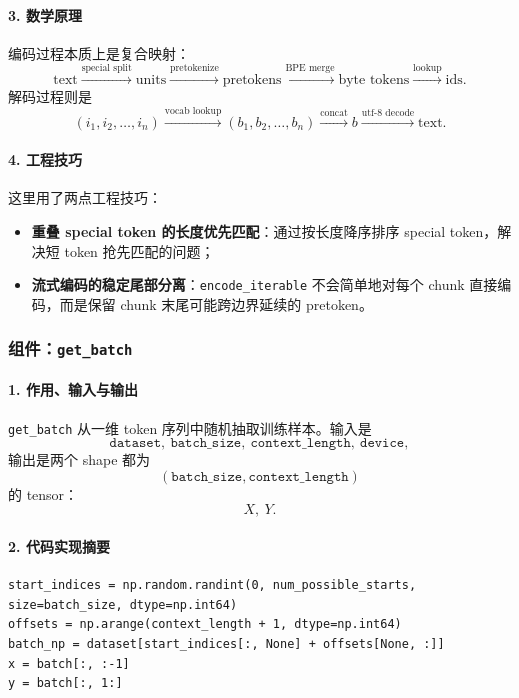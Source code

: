 \documentclass[UTF8,a4paper,11pt]{ctexart}
\begin{document}
\paragraph{3. 数学原理}
编码过程本质上是复合映射：
\[
\text{text}
\xrightarrow{\text{special split}}
\text{units}
\xrightarrow{\text{pretokenize}}
\text{pretokens}
\xrightarrow{\text{BPE merge}}
\text{byte tokens}
\xrightarrow{\text{lookup}}
\text{ids}.
\]
解码过程则是
\[
(i_1, i_2, \dots, i_n)
\xrightarrow{\text{vocab lookup}}
(b_1, b_2, \dots, b_n)
\xrightarrow{\text{concat}}
b
\xrightarrow{\text{utf-8 decode}}
\text{text}.
\]

\paragraph{4. 工程技巧}
这里用了两点工程技巧：
\begin{itemize}[leftmargin=2em]
  \item \textbf{重叠 special token 的长度优先匹配}：通过按长度降序排序 special token，解决短 token 抢先匹配的问题；
  \item \textbf{流式编码的稳定尾部分离}：\texttt{encode\_iterable} 不会简单地对每个 chunk 直接编码，而是保留 chunk 末尾可能跨边界延续的 pretoken。
\end{itemize}

\subsubsection{组件：\texttt{get\_batch}}
\paragraph{1. 作用、输入与输出}
\texttt{get\_batch} 从一维 token 序列中随机抽取训练样本。输入是
\[
\texttt{dataset},\ \texttt{batch\_size},\ \texttt{context\_length},\ \texttt{device},
\]
输出是两个 shape 都为
\[
(\texttt{batch\_size}, \texttt{context\_length})
\]
的 tensor：
\[
X,\ Y.
\]

\paragraph{2. 代码实现摘要}
\begin{lstlisting}
start_indices = np.random.randint(0, num_possible_starts, size=batch_size, dtype=np.int64)
offsets = np.arange(context_length + 1, dtype=np.int64)
batch_np = dataset[start_indices[:, None] + offsets[None, :]]
x = batch[:, :-1]
y = batch[:, 1:]
\end{lstlisting}
\end{document}
